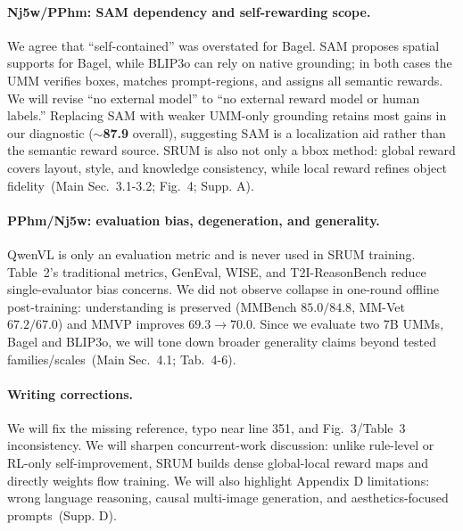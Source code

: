 \documentclass[10pt,twocolumn,letterpaper]{article}
\newcommand{\RN}{\textcolor{revblue}{\textbf{Nj5w}}}
\newcommand{\RP}{\textcolor{revgreen}{\textbf{PPhm}}}
\newcommand{\good}[1]{\textcolor{revgreen}{\textbf{#1}}}
\newcommand{\src}[1]{\textcolor{revblue}{\footnotesize\,(#1)}}
\newcommand{\tightpara}[1]{\vspace{-0.9em}\paragraph{#1}\vspace{-0.25em}}
\begin{document}
\tightpara{\RN/\RP: SAM dependency and self-rewarding scope.}
We agree that ``self-contained'' was overstated for Bagel. SAM proposes spatial supports for Bagel, while BLIP3o can rely on native grounding; in both cases the UMM verifies boxes, matches prompt-regions, and assigns all semantic rewards. We will revise ``no external model'' to ``no external reward model or human labels.'' Replacing SAM with weaker UMM-only grounding retains most gains in our diagnostic (\(\sim\)\good{87.9} overall), suggesting SAM is a localization aid rather than the semantic reward source. SRUM is also not only a bbox method: global reward covers layout, style, and knowledge consistency, while local reward refines object fidelity \src{Main Sec.~3.1-3.2; Fig.~4; Supp. A}.

\tightpara{\RP/\RN: evaluation bias, degeneration, and generality.}
QwenVL is only an evaluation metric and is never used in SRUM training. Table~2's traditional metrics, GenEval, WISE, and T2I-ReasonBench reduce single-evaluator bias concerns. We did not observe collapse in one-round offline post-training: understanding is preserved (MMBench \good{\(85.0/84.8\)}, MM-Vet \good{\(67.2/67.0\)}) and MMVP improves \good{\(69.3\!\to\!70.0\)}. Since we evaluate two 7B UMMs, Bagel and BLIP3o, we will tone down broader generality claims beyond tested families/scales \src{Main Sec.~4.1; Tab.~4-6}.

\tightpara{Writing corrections.}
We will fix the missing reference, typo near line 351, and Fig.~3/Table~3 inconsistency. We will sharpen concurrent-work discussion: unlike rule-level or RL-only self-improvement, SRUM builds dense global-local reward maps and directly weights flow training. We will also highlight Appendix D limitations: wrong language reasoning, causal multi-image generation, and aesthetics-focused prompts \src{Supp. D}.
\end{document}
